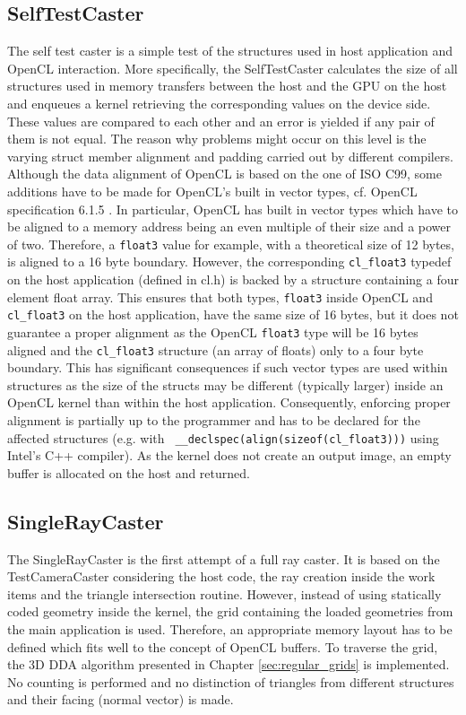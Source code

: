 \subsection{SelfTestCaster}

The self test caster is a simple test of the structures used in host application and OpenCL interaction. More specifically, the SelfTestCaster calculates the size of all structures used in memory transfers between the host and the GPU on the host and enqueues a kernel retrieving the corresponding values on the device side. These values are compared to each other and an error is yielded if any pair of them is not equal.
The reason why problems might occur on this level is the varying struct member alignment and padding carried out by different compilers. Although the data alignment of OpenCL is based on the one of ISO C99, some additions have to be made for OpenCL's built in vector types, cf. OpenCL specification 6.1.5 \cite{opencl_spec}. In particular, OpenCL has built in vector types which have to be aligned to a memory address being an even multiple of their size and a power of two. Therefore, a \lstinline!float3! value for example, with a theoretical size of 12 bytes, is aligned to a 16 byte boundary. However, the corresponding \lstinline!cl_float3! typedef on the host application (defined in cl.h) is backed by a structure containing a four element float array. This ensures that both types, \lstinline!float3! inside OpenCL and \lstinline!cl_float3! on the host application, have the same size of 16 bytes, but it does not guarantee a proper alignment as the OpenCL \lstinline!float3! type will be 16 bytes aligned and the \lstinline!cl_float3! structure (an array of floats) only to a four byte boundary. This has significant consequences if such vector types are used within structures as the size of the structs may be different (typically larger) inside an OpenCL kernel than within the host application. Consequently, enforcing proper alignment is partially up to the programmer and has to be declared for the affected structures (e.g. with \lstinline! __declspec(align(sizeof(cl_float3)))! using Intel's C++ compiler).
As the kernel does not create an output image, an empty buffer is allocated on the host and returned.


\subsection{SingleRayCaster}

The SingleRayCaster is the first attempt of a full ray caster. It is based on the TestCameraCaster considering the host code, the ray creation inside the work items and the triangle intersection routine. However, instead of using statically coded geometry inside the kernel, the grid containing the loaded geometries from the main application is used. Therefore, an appropriate memory layout has to be defined which fits well to the concept of OpenCL buffers. To traverse the grid, the 3D DDA algorithm presented in Chapter \ref{sec:regular_grids} is implemented. No counting is performed and no distinction of triangles from different structures and their facing (normal vector) is made.

